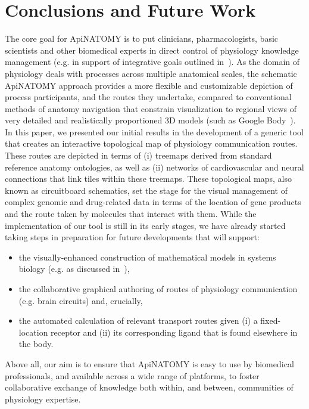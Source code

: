 \section{Conclusions and Future Work} \label{sect:conclusions}                           %

The core goal for ApiNATOMY is to put clinicians, pharmacologists, basic
scientists and other biomedical experts in direct control of physiology
knowledge management (e.g. in support of integrative goals outlined in~\cite{hunter_vision_2010}). As
the domain of physiology deals with processes across multiple anatomical scales,
the schematic ApiNATOMY approach provides a more flexible and customizable
depiction of process participants, and the routes they undertake, compared to
conventional methods of anatomy navigation that constrain visualization to
regional views of very detailed and realistically proportioned 3D models (such as
Google Body~\cite{ZygoteBody}).
In this paper, we presented our initial results in the development of a generic
tool that creates an interactive topological map of physiology communication
routes. These routes are depicted in terms of (i) treemaps derived from standard
reference anatomy ontologies, as well as (ii) networks of cardiovascular and
neural connections that link tiles within these treemaps. These topological maps,
also known as circuitboard schematics, set the stage for the visual management
of complex genomic and drug-related data in terms of the location of gene
products and the route taken by molecules that interact with them. While the
implementation of our tool is still in its early stages, we have already started
taking steps in preparation for future developments that will support:

\begin{itemize}
  \item the visually-enhanced construction of mathematical models in systems 
biology (e.g. as discussed in~\cite{de_bono_integrating_2012}),
  \item the collaborative graphical authoring of routes of physiology
communication (e.g. brain circuits) and, crucially,
  \item the automated calculation of relevant transport routes given (i) a fixed-
location receptor and (ii) its corresponding ligand that is found elsewhere
in the body.
\end{itemize}

Above all, our aim is to ensure that ApiNATOMY is easy to use by biomedical
professionals, and available across a wide range of platforms, to foster
collaborative exchange of knowledge both within, and between, communities of
physiology expertise. 